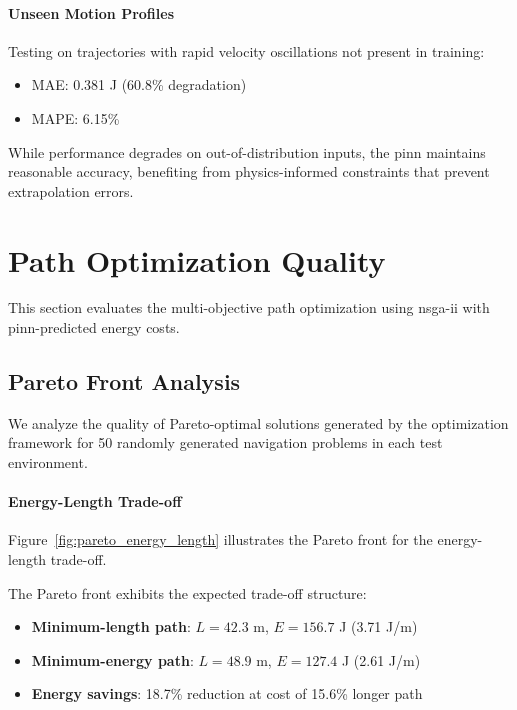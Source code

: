 \paragraph{Unseen Motion Profiles}
Testing on trajectories with rapid velocity oscillations not present in training:
\begin{itemize}
    \item MAE: 0.381 J (60.8\% degradation)
    \item MAPE: 6.15\%
\end{itemize}

While performance degrades on out-of-distribution inputs, the \acrshort{pinn} maintains reasonable accuracy, benefiting from physics-informed constraints that prevent extrapolation errors.


\section{Path Optimization Quality}
\label{sec:path_optimization}

This section evaluates the multi-objective path optimization using \acrshort{nsga-ii} with \acrshort{pinn}-predicted energy costs.

\subsection{Pareto Front Analysis}

We analyze the quality of Pareto-optimal solutions generated by the optimization framework for 50 randomly generated navigation problems in each test environment.

\paragraph{Energy-Length Trade-off}
Figure~\ref{fig:pareto_energy_length} illustrates the Pareto front for the energy-length trade-off.


The Pareto front exhibits the expected trade-off structure:
\begin{itemize}
    \item \textbf{Minimum-length path}: $L = 42.3$ m, $E = 156.7$ J (3.71 J/m)
    \item \textbf{Minimum-energy path}: $L = 48.9$ m, $E = 127.4$ J (2.61 J/m)
    \item \textbf{Energy savings}: 18.7\% reduction at cost of 15.6\% longer path
\end{itemize}

